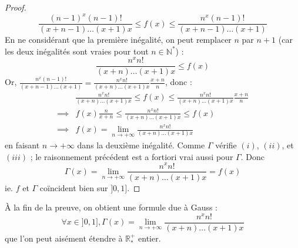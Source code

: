 \begin{proof}
		\[ \frac{(n-1)^x (n-1)!}{(x+n-1) \dots (x+1)x} \leq f(x) \leq \frac{n^x (n-1)!}{(x+n-1) \dots (x+1)} \]
		En ne considérant que la première inégalité, on peut remplacer $n$ par $n+1$ (car les deux inégalités sont vraies pour tout $n \in \mathbb{N}^*$) :
		\[ \frac{n^x n!}{(x+n) \dots (x+1)x} \leq f(x) \]
		Or, $\frac{n^x (n-1)!}{(x+n-1) \dots (x+1)} = \frac{n^x n!}{(x+n) \dots (x+1)x} \frac{x+n}{n}$, donc :
		\begin{align*}
			&\frac{n^x n!}{(x+n) \dots (x+1)x} \leq f(x) \leq \frac{n^x n!}{(x+n) \dots (x+1)x} \frac{x+n}{n} \\
			\implies & f(x) \frac{n}{x+n} \leq \frac{n^x n!}{(x+n) \dots (x+1)x} \leq f(x) \\
			\implies & f(x) = \lim_{n \rightarrow +\infty} \frac{n^x n!}{(x+n) \dots (x+1)x}
		\end{align*}
		en faisant $n \longrightarrow +\infty$ dans la deuxième inégalité. Comme $\Gamma$ vérifie $(i)$, $(ii)$, et $(iii)$ ; le raisonnement précédent est a fortiori vrai aussi pour $\Gamma$. Donc
		\[ \Gamma(x) = \lim_{n \rightarrow +\infty} \frac{n^x n!}{(x+n) \dots (x+1)x} = f(x)  \]
		ie. $f$ et $\Gamma$ coïncident bien sur $]0, 1]$.
	\end{proof}

	\begin{remark}
		À la fin de la preuve, on obtient une formule due à Gauss :
		\[ \forall x \in ]0, 1], \Gamma(x) = \lim_{n \rightarrow +\infty} \frac{n^x n!}{(x+n) \dots (x+1)x} \]
		que l'on peut aisément étendre à $\mathbb{R}^+_*$ entier.
	\end{remark}

